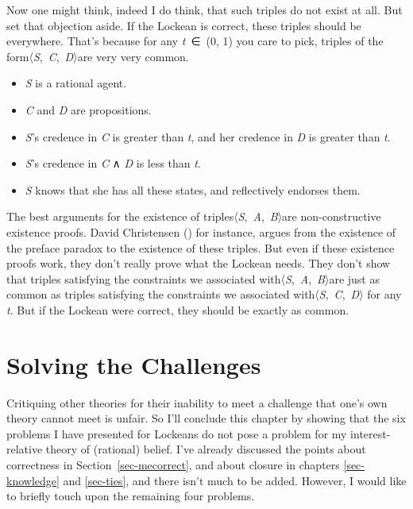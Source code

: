 \documentclass[
  12pt,
  letterpaper,
]{scrbook}
\providecommand{\tightlist}{%
  \setlength{\itemsep}{0pt}\setlength{\parskip}{0pt}}\usepackage{longtable,booktabs,array}
\begin{document}
Now one might think, indeed I do think, that such triples do not exist
at all. But set that objection aside. If the Lockean is correct, these
triples should be everywhere. That's because for any \emph{t}~∈~(0, 1)
you care to pick, triples of the form〈\emph{S},~\emph{C},~\emph{D}〉are
very very common.

\begin{itemize}
\tightlist
\item
  \emph{S} is a rational agent.
\item
  \emph{C} and \emph{D} are propositions.
\item
  \emph{S}'s credence in \emph{C} is greater than \emph{t}, and her
  credence in \emph{D} is greater than \emph{t}.
\item
  \emph{S}'s credence in \emph{C} ∧ \emph{D} is less than \emph{t}.
\item
  \emph{S} knows that she has all these states, and reflectively
  endorses them.
\end{itemize}

The best arguments for the existence of
triples〈\emph{S},~\emph{A},~\emph{B}〉are non-constructive existence
proofs. David Christensen () for
instance, argues from the existence of the preface paradox to the
existence of these triples. But even if these existence proofs work,
they don't really prove what the Lockean needs. They don't show that
triples satisfying the constraints we associated
with〈\emph{S},~\emph{A},~\emph{B}〉are just as common as triples
satisfying the constraints we associated
with〈\emph{S},~\emph{C},~\emph{D}〉 for any \emph{t}. But if the
Lockean were correct, they should be exactly as common.

\section{Solving the Challenges}\label{sec-solving}

Critiquing other theories for their inability to meet a challenge that
one's own theory cannot meet is unfair. So I'll conclude this chapter by
showing that the six problems I have presented for Lockeans do not pose
a problem for my interest-relative theory of (rational) belief. I've
already discussed the points about correctness in
Section~\ref{sec-mecorrect}, and about closure in chapters
\ref{sec-knowledge} and \ref{sec-ties}, and there isn't much to be
added. However, I would like to briefly touch upon the remaining four
problems.
\end{document}
